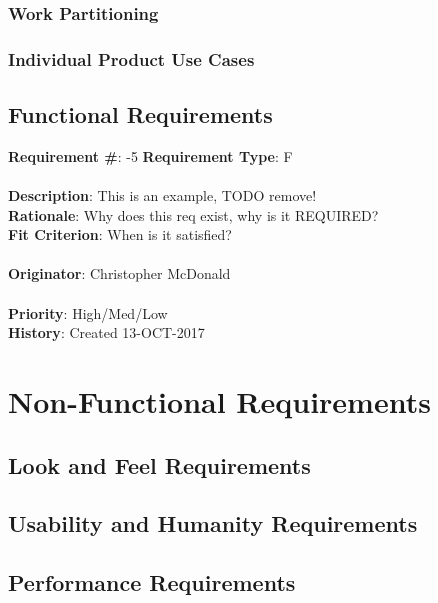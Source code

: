 \documentclass[11pt]{article}
\begin{document}
\subsubsection{Work Partitioning}
\subsubsection{Individual Product Use Cases}

\subsection{Functional Requirements}

\begin{framed}
	\noindent\textbf{Requirement \#}: -5 \hfill \textbf{Requirement Type}: F \hfill\\\\
	\noindent\textbf{Description}: This is an example, TODO remove!  \\
	\textbf{Rationale}: Why does this req exist, why is it REQUIRED? \\
	\textbf{Fit Criterion}: When is it satisfied? \\\\
	\textbf{Originator}: Christopher McDonald \\\\
	\textbf{Priority}: High/Med/Low \hfill \\
	\noindent\textbf{History}: Created 13-OCT-2017
\end{framed}


\section{Non-Functional Requirements}

\subsection{Look and Feel Requirements}

\subsection{Usability and Humanity Requirements}

\subsection{Performance Requirements}
\end{document}
